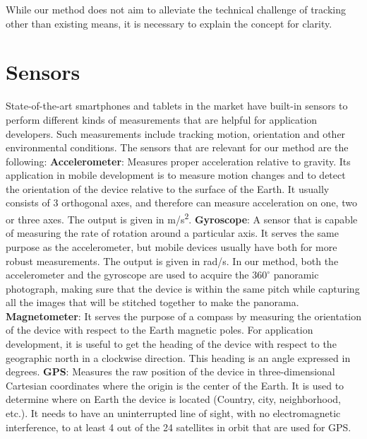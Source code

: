 While our method does not aim to alleviate the technical challenge of tracking other than existing means, it is necessary to explain the concept for clarity. 

\section{Sensors}
State-of-the-art smartphones and tablets in the market have built-in sensors to perform different kinds of measurements that are helpful for application developers. Such measurements include tracking motion, orientation and other environmental conditions. The sensors that are relevant for our method are the following:\newline
\textbf{Accelerometer}: Measures proper acceleration relative to gravity. Its application in mobile development is to measure motion changes and to detect the orientation of the device relative to the surface of the Earth. It usually consists of 3 orthogonal axes, and therefore can measure acceleration on one, two or three axes. The output is given in m/s\textsuperscript{2}. \newline
\textbf{Gyroscope}: A sensor that is capable of measuring the rate of rotation around a particular axis. It serves the same purpose as the accelerometer, but mobile devices usually have both for more robust measurements. The output is given in rad/s. In our method, both the accelerometer and the gyroscope are used to acquire the $360^{\circ}$  panoramic photograph, making sure that the device is within the same pitch while capturing all the images that will be stitched together to make the panorama. \newline
\textbf{Magnetometer}: It serves the purpose of a compass by measuring the orientation of the device with respect to the Earth magnetic poles. For application development, it is useful to get the heading of the device with respect to the geographic north in a clockwise direction. This heading is an angle expressed in degrees.\newline
\textbf{GPS}: Measures the raw position of the device in three-dimensional Cartesian coordinates where the origin is the center of the Earth. It is used to determine where on Earth the device is located (Country, city, neighborhood, etc.). It needs to have an uninterrupted line of sight, with no electromagnetic interference, to at least 4 out of the 24 satellites in orbit that are used for GPS.

